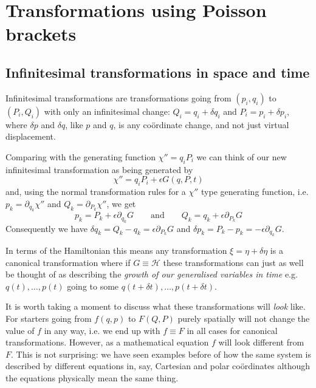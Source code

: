 \documentclass[english,seminar,headertitle]{lecture}
\newcommand{\ham}{\mathscr{H}}
\begin{document}
\section{Transformations using Poisson brackets}
\subsection{Infinitesimal transformations in space and time}

Infinitesimal transformations are transformations going from $(p_i,q_i)$ to $(P_i,Q_i)$ with only an infinitesimal change: $Q_i = q_i + \delta q_i$ and $P_i = p_i + \delta p_i$, where $\delta p$ and $\delta q$, like $p$ and $q$, is any co\"{o}rdinate change, and not just virtual displacement.

Comparing with the generating function $\chi'' = q_iP_i$ we can think of our new infinitesimal transformation as being generated by
$$
\chi'' = q_iP_i + \epsilon G(q,P,t)
$$
and, using the normal transformation rules for a $\chi''$ type generating function, i.e. $p_k = \partial_{q_k} \chi''$ and $Q_k = \partial_{P_k} \chi''$, we get
\begin{equation}
p_k = P_k + \epsilon \partial_{q_k} G \qquad\textrm{and}\qquad Q_k = q_k + \epsilon \partial_{P_k} G \label{eq:q-G-relation}
\end{equation}%
Consequently we have $\delta q_k = Q_k - q_k = \epsilon \partial_{P_k} G$ and $\delta p_k = P_k - p_k = -\epsilon \partial_{q_k} G$.

In terms of the Hamiltonian this means any transformation $\xi = \eta + \delta \eta$ is a canonical transformation where if $G \equiv \ham$ these transformations can just as well be thought of as describing the \textit{growth of our generalised variables in time} e.g. $q(t), \ldots, p(t)$ going to some $q(t+\delta t),\ldots,p(t+\delta t)$.

It is worth taking a moment to discuss what these transformations will \textit{look} like. For starters going from $f(q,p)$ to $F(Q,P)$ purely spatially will not change the value of $f$ in any way, i.e. we end up with $f \equiv F$ in all cases for canonical transformations. However, as a mathematical equation $f$ will look different from $F$. This is not surprising: we have seen examples before of how the same system is described by different equations in, say, Cartesian and polar co\"{o}rdinates although the equations physically mean the same thing.
\end{document}
